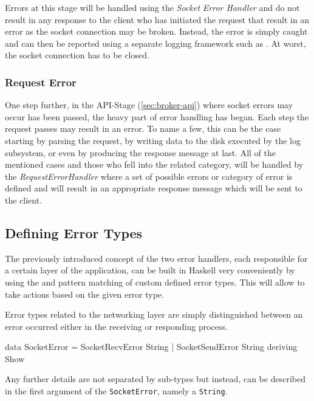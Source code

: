 Errors at this stage will be handled using the \textit{Socket Error Handler} and
do not result in any response to the client who has initiated the request that
result in an error as the socket connection may be broken. Instead, the error is
simply caught and can then be reported using a separate logging framework such
as . At worst, the
socket connection has to be closed.

\subsubsection{Request Error}

One step further, in the API-Stage (\ref{sec:broker-api}) where socket errors
may occur has been passed, the heavy part of error handling has began. Each step
the request passes may result in an error. To name a few, this can be the case
starting by parsing the request, by writing data to the disk executed by the log
subsystem, or even by producing the response message at last. All of the
mentioned cases and those who fell into the related category, will be handled by
the \textit{RequestErrorHandler} where a set of possible errors or category of
error is defined and will result in an appropriate response message which will
be sent to the client.


\subsection{Defining Error Types}

The previously introduced concept of the two error handlers, each responsible
for a certain layer of the application, can be built in Haskell very
conveniently by using the 
and pattern matching of custom defined error types. This will allow to take
actions based on the given error type.  

Error types related to the networking layer are simply distinguished between an
error occurred either in the receiving or responding process.

\begin{code}
data SocketError =
      SocketRecvError String
      | SocketSendError String
      deriving Show
\end{code}

Any further details are not separated by sub-types but instead, can be described
in the first argument of the \lstinline{SocketError}, namely a
\lstinline{String}.

